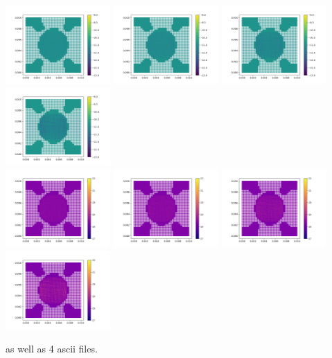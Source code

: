 \begin{center}
\includegraphics[width=4cm]{python_codes/fieldstone_145/strainrate_0000.png}
\includegraphics[width=4cm]{python_codes/fieldstone_145/strainrate_0001.png}
\includegraphics[width=4cm]{python_codes/fieldstone_145/strainrate_0002.png}
\includegraphics[width=4cm]{python_codes/fieldstone_145/strainrate_0003.png}\\
\includegraphics[width=4cm]{python_codes/fieldstone_145/viscosity_0000.png}
\includegraphics[width=4cm]{python_codes/fieldstone_145/viscosity_0001.png}
\includegraphics[width=4cm]{python_codes/fieldstone_145/viscosity_0002.png}
\includegraphics[width=4cm]{python_codes/fieldstone_145/viscosity_0003.png}
\end{center}
 as well as 4 ascii files.

